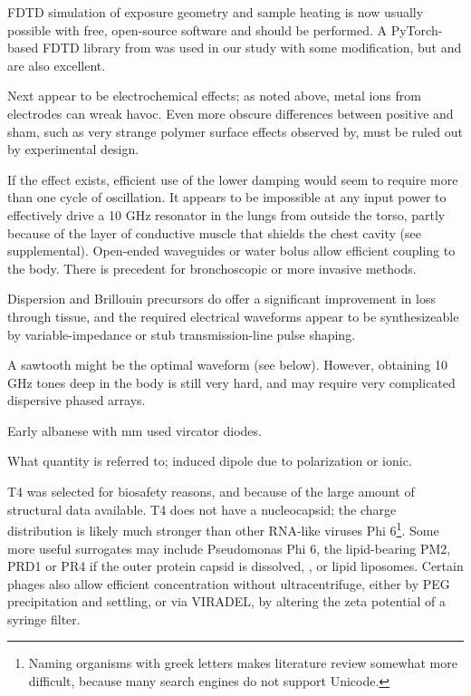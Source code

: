 \documentclass[paper.tex]{subfiles}
\begin{document}
\begin{multicols}{1}
FDTD simulation of exposure geometry and sample heating is now usually possible with free, open-source software and should be performed. A PyTorch-based FDTD library from \cite{Highly2019} was used in our study with some modification, but \cite{CUDAbased2019} and \cite{openEMS} are also excellent. 

Next appear to be electrochemical\cite{Comparative2003} effects; as noted above, metal ions from electrodes can wreak havoc. Even more obscure differences between positive and sham, such as very strange polymer surface effects observed by\cite{Effect1994a}, must be ruled out by experimental design.

If the effect exists, efficient use of the lower damping would seem to require more than one cycle of oscillation. It appears to be impossible at any input power to effectively drive a 10 GHz resonator in the lungs from outside the torso, partly because of the layer of conductive muscle that shields the chest cavity (see supplemental). Open-ended waveguides\cite{OpenEnded1982}\cite{Analysis1989}\cite{142018} or water bolus allow efficient coupling to the body. There is precedent for bronchoscopic \cite{Flexible2019}\cite{Antenna2018} or more invasive methods\cite{Implantable1980}\cite{Implantable1982}\cite{Electromagnetic1983}. 

Dispersion and Brillouin precursors do offer a significant improvement in loss through tissue, and the required electrical waveforms appear to be synthesizeable by variable-impedance or stub transmission-line pulse shaping\cite{Coaxial1985}\cite{Arbitrarya}. 

A sawtooth might be the optimal waveform (see below). However, obtaining 10 GHz tones deep in the body is still very hard, and may require very complicated dispersive phased arrays\cite{Microwave1982a}.

Early albanese with mm used vircator diodes. 

What quantity is referred to; induced dipole due to polarization or ionic.

T4 was selected for biosafety reasons, and because of the large amount of structural data available. T4 does not have a nucleocapsid; the charge distribution is likely much stronger than other RNA-like viruses Phi 6\footnote{Naming organisms with greek letters makes literature review somewhat more difficult, because many search engines do not support Unicode.}. Some more useful surrogates may include Pseudomonas Phi 6\cite{Selection2017}, the lipid-bearing PM2, PRD1 or PR4\cite{Lipidcontaining1979} if the outer protein capsid is dissolved\cite{Bacteriophage2002}, \cite{Dissociation1993}, or lipid liposomes. Certain phages also allow efficient concentration without ultracentrifuge, either by PEG precipitation\cite{Rapid1970} and settling, or via VIRADEL\cite{GROWTH}\cite{Chemical1982}\cite{highly1988}\cite{AdsorptionElution1989}, by altering the zeta potential of a syringe filter. 


\end{multicols}
\end{document}
